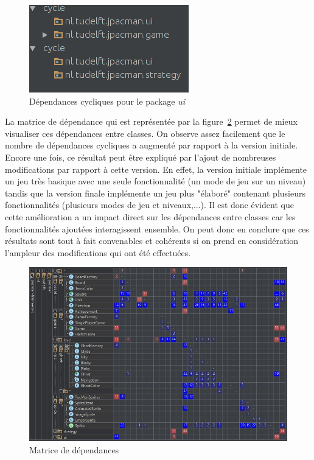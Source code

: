 \documentclass[12pt, openany]{report}
\begin{document}
\begin{figure}[!h]
	\centering
	\includegraphics[scale=0.6]{Images/CyclicDependencyFinal13.png}    
		\caption{Dépendances cycliques pour le package \textit{ui}}
	\label{CyclicDependencyFinal8}
\end{figure}




\newpage

La matrice de dépendance qui est représentée par la figure~\ref{DependencyMatrix2} permet de mieux visualiser ces dépendances entre classes. On observe assez facilement que le nombre de dépendances cycliques a augmenté par rapport à la version initiale. Encore une fois, ce résultat peut être expliqué par l'ajout de nombreuses modifications par rapport à cette version. En effet, la version initiale implémente un jeu très basique avec une seule fonctionnalité (un mode de jeu sur un niveau) tandis que la version finale implémente un jeu plus "élaboré" contenant plusieurs fonctionnalités (plusieurs modes de jeu et niveaux,...). Il est donc évident que cette amélioration a un impact direct sur les dépendances entre classes car les fonctionnalités ajoutées interagissent ensemble. On peut donc en conclure que ces résultats sont tout à fait convenables et cohérents si on prend en considération l'ampleur des modifications qui ont été effectuées.

\begin{figure}[!h]
	\centering
	\includegraphics[scale=0.5]{Images/DependencyMatrix2.JPG}
	\caption{Matrice de dépendances}
	\label{DependencyMatrix2}
\end{figure} 
\end{document}
